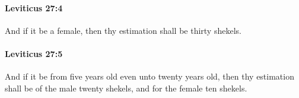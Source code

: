 		\paragraph{Leviticus 27:4} %
			\label{LEVITICUS-27-4}

			And if it be a female, then thy estimation shall be thirty shekels.


		\paragraph{Leviticus 27:5} %
			\label{LEVITICUS-27-5}

			And if it be from five years old even unto twenty years old, then thy estimation shall be of the male twenty shekels, and for the female ten shekels.


